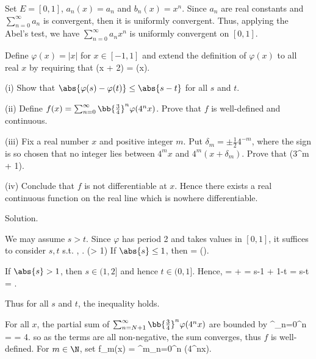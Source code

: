 Set $E =[0,1]$, $a_n(x)=a_n$ and $b_n(x) = x^n$. Since $a_n$ are real constants and $\sum^\infty_{n=0} a_n$ is convergent, then it is uniformly convergent. Thus, applying the Abel's test, we have $\sum^\infty_{n=0} a_nx^n$ is uniformly convergent on $[0,1]$.

\begin{exercise}
Define $\varphi(x) = |x|$ for $x\in [-1, 1]$ and extend the definition of $\varphi(x)$ to all real $x$ by requiring that
\be
\varphi(x + 2) = \varphi(x).
\ee
\ben
\item [(i)] Show that $\abs{\varphi(s) - \varphi(t)} \leq \abs{s - t}$ for all $s$ and $t$.
\item [(ii)] Define $f(x) = \sum^\infty_{n=0} \bb{\frac 34}^n \varphi(4^nx)$. Prove that $f$ is well-defined and continuous.
\item [(iii)] Fix a real number $x$ and positive integer $m$. Put $\delta_m = \pm \frac 12 4^{-m}$, where the sign is so chosen that no integer lies between $4^m x$ and $4^m(x + \delta_m)$. Prove that
\be
{} \geq {} (3^m + 1).
\ee
\item [(iv)] Conclude that $f$ is not differentiable at $x$. Hence there exists a real continuous function on the real line which is nowhere differentiable.
\een
\end{exercise}

\scutline

Solution. \ben
\item [(i)] We may assume $s>t$. Since $\varphi$ has period 2 and takes values in $[0,1]$, it suffices to consider $s,t$ s.t. 
\be
{} ,\quad\quad {} . \quad (> 1)
\ee
If $\abs{s} \leq 1$, then
\be
{} =  \leq {} \quad\quad ().
\ee

If $\abs{s} >1$, then $s\in (1,2]$ and hence $t\in (0,1]$. Hence,
\be
{} =  \leq {}+ = s-1 + 1-t = s-t = .
\ee

Thus for all $s$ and $t$, the inequality holds.

\item [(ii)] For all $x$, the partial sum of $\sum^\infty_{n=N+1} \bb{\frac 34}^n \varphi(4^nx)$ are bounded by 
\be
\sum^\infty_{n=0}^n =  = 4.
\ee
so as the terms are all non-negative, the sum converges, thus $f$ is well-defined. For $m\in\N$, set
\be
f_m(x) = \sum^m_{n=0}^n \varphi(4^nx).
\ee

